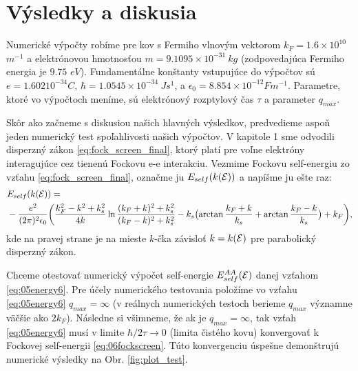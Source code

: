 \section{Výsledky a diskusia}

Numerické výpočty robíme pre kov s Fermiho vlnovým vektorom $k_F = 1.6 \times 10^{10}$ $m^{-1}$ a elektrónovou hmotnosťou  $m = 9.1095 \times 10^{-31} \ kg$ (zodpovedajúca Fermiho energia je $9.75$ $eV$). Fundamentálne konštanty vstupujúce do výpočtov sú $e = 1.602 10^{-34} C$, $\hbar = 1.0545 \times 10^{-34} \ Js^{1}$, a $ \epsilon_0 = 8.854 \times 10^{-12} Fm^{-1}$. Parametre, ktoré vo výpočtoch meníme, sú elektrónový rozptylový čas $\tau$ a parameter
$q_{max}$.


Skôr ako začneme s diskusiou našich hlavných výsledkov, predvedieme aspoň jeden numerický test spoľahlivosti našich výpočtov.
V kapitole 1 sme odvodili disperzný zákon \eqref{eq:fock_screen_final}, ktorý platí pre voľne elektróny interagujúce cez tienenú Fockovu e-e interakciu.
Vezmime Fockovu self-energiu zo vzťahu  \eqref{eq:fock_screen_final}, označme ju $E_{self}(k(\mathcal{E}))$ a napíšme ju ešte raz: 
\begin{align}
\label{eq:06fockscreen}
&E_{self}(k(\mathcal{E}))= \\ \notag
&-\frac{e^2}{(2\pi)^2\epsilon_0} \biggl(
\frac{k_F^2-k^2+k_s^2}{4k} \ln{\frac{(k_F+k)^2+k_s^2}{(k_F-k)^2+k_s^2}}-k_s\bigl(\arctan{\frac{k_F+k}{k_s}}+\arctan{\frac{k_F-k}{k_s}}\bigr)+k_F\biggr) \text{,}
\end{align}
kde na pravej strane je na mieste $k$-čka závisloť $k=k(\mathcal{E})$ pre parabolický disperzný zákon. 

Chceme otestovať numerický výpočet self-energie $E_{self}^{AA}(\mathcal{E})$ danej vzťahom
\eqref{eq:05energy6}. Pre účely numerického testovania položíme  vo vzťahu \eqref{eq:05energy6} 
$q_{max} = \infty$ (v reálnych numerických testoch berieme $q_{max}$ významne väčšie ako $2k_{F}$). Následne si všimneme, že ak je $q_{max} = \infty$, tak vzťah  \eqref{eq:05energy6}
musí v limite $\hbar/2\tau \rightarrow 0$ (limita čistého kovu) konvergovať k Fockovej self-energii \eqref{eq:06fockscreen}.
Túto konvergenciu úspešne demonštrujú numerické výsledky na Obr. \eqref{fig:plot_test}.  


